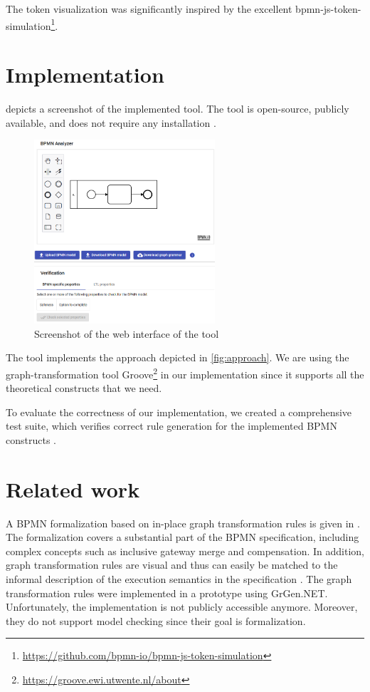 \documentclass[adraft, copyright, creativecommons]{eptcs} %
\begin{document}
The token visualization was significantly inspired by the excellent bpmn-js-token-simulation\footnote{\url{https://github.com/bpmn-io/bpmn-js-token-simulation}}.
\section{Implementation} \label{sec:impl}
 depicts a screenshot of the implemented tool.
The tool is open-source, publicly available, and does not require any installation \cite{timkrauterArtifactsTERMGRAPH2022}.

\begin{figure}[h]
    \centering
    \includegraphics[width=0.6\textwidth]{images/impl.png}
    \caption{Screenshot of the web interface of the tool}
    \label{fig:implScreenshot}
\end{figure}

The tool implements the approach depicted in \cref{fig:approach}.
We are using the graph-transformation tool Groove\footnote{\url{https://groove.ewi.utwente.nl/about}} in our implementation \cite{ghamarianModellingAnalysisUsing2012} since it supports all the theoretical constructs that we need.

To evaluate the correctness of our implementation, we created a comprehensive test suite, which verifies correct rule generation for the implemented BPMN constructs \cite{timkrauterArtifactsTERMGRAPH2022}.

\section{Related work} \label{sec:relatedWork}
A BPMN formalization based on in-place graph transformation rules is given in \cite{vangorpVisualTokenbasedFormalization2013}.
The formalization covers a substantial part of the BPMN specification, including complex concepts such as inclusive gateway merge and compensation.
In addition, graph transformation rules are visual and thus can easily be matched to the informal description of the execution semantics in the specification \cite{objectmanagementgroupBusinessProcessModel2013}.
The graph transformation rules were implemented in a prototype using GrGen.NET.
Unfortunately, the implementation is not publicly accessible anymore.
Moreover, they do not support model checking since their goal is formalization.
\end{document}

